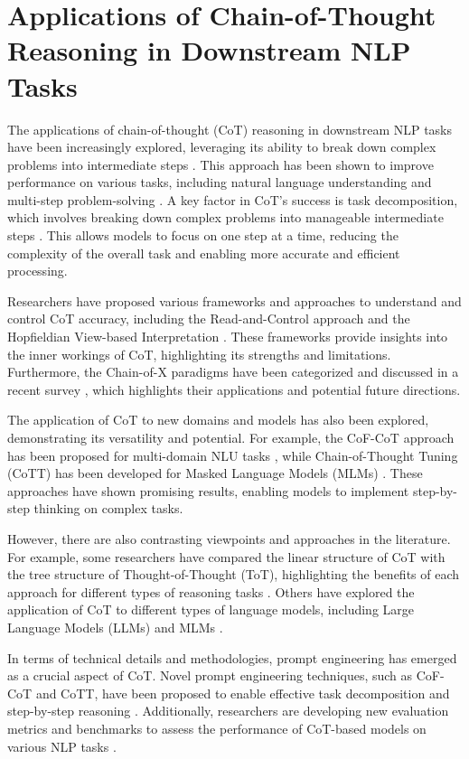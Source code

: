 \documentclass[conference]{IEEEtran}
\begin{document}
\section{Applications of Chain-of-Thought Reasoning in Downstream NLP Tasks}
The applications of chain-of-thought (CoT) reasoning in downstream NLP tasks have been increasingly explored, leveraging its ability to break down complex problems into intermediate steps \cite{b1}. This approach has been shown to improve performance on various tasks, including natural language understanding and multi-step problem-solving \cite{b2}. A key factor in CoT's success is task decomposition, which involves breaking down complex problems into manageable intermediate steps \cite{b3}. This allows models to focus on one step at a time, reducing the complexity of the overall task and enabling more accurate and efficient processing.

Researchers have proposed various frameworks and approaches to understand and control CoT accuracy, including the Read-and-Control approach \cite{b4} and the Hopfieldian View-based Interpretation \cite{b5}. These frameworks provide insights into the inner workings of CoT, highlighting its strengths and limitations. Furthermore, the Chain-of-X paradigms have been categorized and discussed in a recent survey \cite{b6}, which highlights their applications and potential future directions.

The application of CoT to new domains and models has also been explored, demonstrating its versatility and potential. For example, the CoF-CoT approach has been proposed for multi-domain NLU tasks \cite{b7}, while Chain-of-Thought Tuning (CoTT) has been developed for Masked Language Models (MLMs) \cite{b8}. These approaches have shown promising results, enabling models to implement step-by-step thinking on complex tasks.

However, there are also contrasting viewpoints and approaches in the literature. For example, some researchers have compared the linear structure of CoT with the tree structure of Thought-of-Thought (ToT), highlighting the benefits of each approach for different types of reasoning tasks \cite{b9}. Others have explored the application of CoT to different types of language models, including Large Language Models (LLMs) and MLMs \cite{b10}.

In terms of technical details and methodologies, prompt engineering has emerged as a crucial aspect of CoT. Novel prompt engineering techniques, such as CoF-CoT and CoTT, have been proposed to enable effective task decomposition and step-by-step reasoning \cite{b11}. Additionally, researchers are developing new evaluation metrics and benchmarks to assess the performance of CoT-based models on various NLP tasks \cite{b12}.
\end{document}
